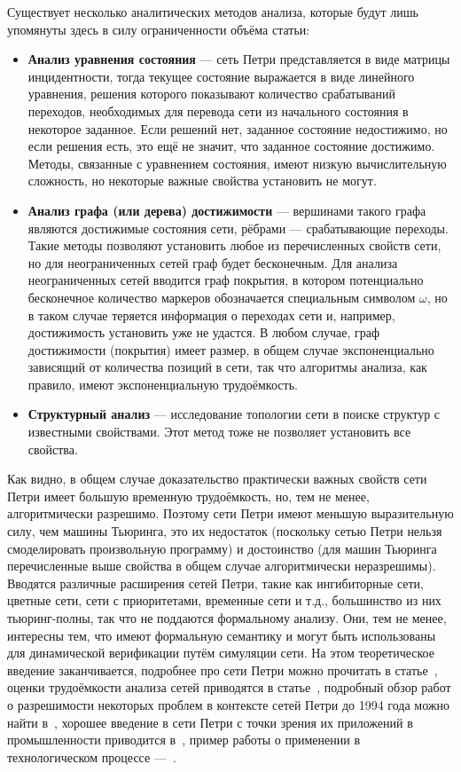 \documentclass[a4, 14pt]{article}
\begin{document}
Существует несколько аналитических методов анализа, которые будут лишь упомянуты 
здесь в силу ограниченности объёма статьи:
\begin{itemize}
  \item \textbf{Анализ уравнения состояния} --- сеть Петри представляется в виде матрицы 
    инцидентности, тогда текущее состояние выражается в виде линейного уравнения, 
    решения которого показывают количество срабатываний переходов, необходимых 
    для перевода сети из начального состояния в некоторое заданное. Если решений 
    нет, заданное состояние недостижимо, но если решения есть, это ещё не значит, 
    что заданное состояние достижимо. Методы, связанные с уравнением состояния, 
    имеют низкую вычислительную сложность, но некоторые важные свойства установить 
    не могут.
  \item \textbf{Анализ графа (или дерева) достижимости} --- вершинами такого графа 
    являются достижимые состояния сети, рёбрами --- срабатывающие переходы. Такие 
    методы позволяют установить любое из перечисленных свойств сети, но для 
    неограниченных сетей граф будет бесконечным. Для анализа неограниченных сетей 
    вводится граф покрытия, в котором потенциально бесконечное количество маркеров 
    обозначается специальным символом $\omega$, но в таком случае теряется 
    информация о переходах сети и, например, достижимость установить уже 
    не удастся. В любом случае, граф достижимости (покрытия) имеет размер, в 
    общем случае экспоненциально зависящий от количества позиций в сети, так что 
    алгоритмы анализа, как правило, имеют экспоненциальную трудоёмкость.
  \item \textbf{Структурный анализ} --- исследование топологии сети в поиске структур с 
    известными свойствами. Этот метод тоже не позволяет установить все свойства.
\end{itemize}

Как видно, в общем случае доказательство практически важных свойств сети Петри 
имеет большую временную трудоёмкость, но, тем не менее, алгоритмически разрешимо. 
Поэтому сети Петри имеют меньшую выразительную силу, чем машины Тьюринга, это их 
недостаток (поскольку сетью Петри нельзя смоделировать произвольную программу) и 
достоинство (для машин Тьюринга перечисленные выше свойства в общем случае 
алгоритмически неразрешимы). Вводятся различные расширения сетей Петри, такие 
как ингибиторные сети, цветные сети, сети с приоритетами, временные сети и т.д., 
большинство из них тьюринг-полны, так что не поддаются формальному анализу. 
Они, тем не менее, интересны тем, что имеют формальную семантику и могут быть 
использованы для динамической верификации путём симуляции сети. На этом 
теоретическое введение заканчивается, подробнее про сети Петри можно прочитать в 
статье~\cite{murata1989petri}, оценки трудоёмкости анализа сетей приводятся в 
статье~\cite{yen2006petri}, подробный обзор работ о разрешимости некоторых проблем в контексте 
сетей Петри до 1994 года можно найти в~\cite{esparza1994decidability}, хорошее введение в сети Петри 
с точки зрения их приложений в промышленности приводится в~\cite{zurawski1994petri}, 
пример работы о применении в технологическом процессе ---~\cite{martynov2014petri}.
\end{document}
